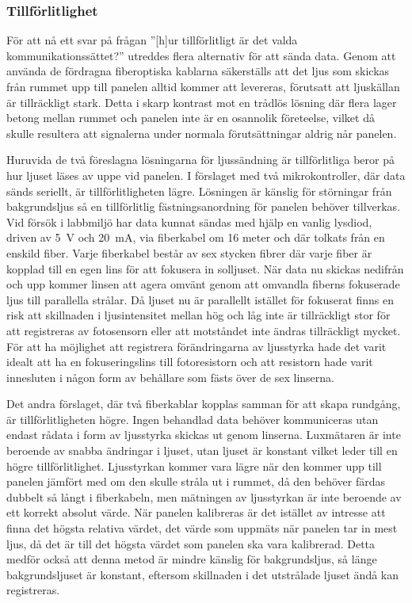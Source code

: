 
        \subsubsection{Tillförlitlighet} %
        \label{sub:tillf_rlitlighet}
            För att nå ett svar på frågan ''[h]ur tillförlitligt är det valda kommunikationssättet?'' utreddes flera alternativ för att sända data. Genom att använda de fördragna fiberoptiska kablarna säkerställs att det ljus som skickas från rummet upp till panelen alltid kommer att levereras, förutsatt att ljuskällan är tillräckligt stark. Detta i skarp kontrast mot en trådlös lösning där flera lager betong mellan rummet och panelen inte är en osannolik företeelse, vilket då skulle resultera att signalerna under normala förutsättningar aldrig når panelen. \bigskip

            Huruvida de två föreslagna lösningarna för ljussändning är tillförlitliga beror på hur ljuset läses av uppe vid panelen. I förslaget med två mikrokontroller, där data sänds seriellt, är tillförlitligheten lägre. Lösningen är känslig för störningar från bakgrundsljus så en tillförlitlig fästningsanordning för panelen behöver tillverkas. Vid försök i labbmiljö har data kunnat sändas med hjälp en vanlig lysdiod, driven av 5~V och 20~mA, via fiberkabel om 16 meter och där tolkats från en enskild fiber. Varje fiberkabel består av sex stycken fibrer där varje fiber är kopplad till en egen lins för att fokusera in solljuset. När data nu skickas nedifrån och upp kommer linsen att agera omvänt genom att omvandla fiberns fokuserade ljus till parallella strålar. Då ljuset nu är parallellt istället för fokuserat finns en risk att skillnaden i ljusintensitet mellan hög och låg inte är tillräckligt stor för att registreras av fotosensorn eller att motståndet inte ändras tillräckligt mycket. För att ha möjlighet att registrera förändringarna av ljusstyrka hade det varit idealt att ha en fokuseringslins till fotoresistorn och att resistorn hade varit innesluten i någon form av behållare som fästs över de sex linserna. \bigskip

            Det andra förslaget, där två fiberkablar kopplas samman för att skapa rundgång, är tillförlitligheten högre. Ingen behandlad data behöver kommuniceras utan endast rådata i form av ljusstyrka skickas ut genom linserna. Luxmätaren är inte beroende av snabba ändringar i ljuset, utan ljuset är konstant vilket leder till en högre tillförlitlighet. Ljusstyrkan kommer vara lägre när den kommer upp till panelen jämfört med om den skulle stråla ut i rummet, då den behöver färdas dubbelt så långt i fiberkabeln, men mätningen av ljusstyrkan är inte beroende av ett korrekt absolut värde. När panelen kalibreras är det istället av intresse att finna det högsta relativa värdet, det värde som uppmäts när panelen tar in mest ljus, då det är till det högsta värdet som panelen ska vara kalibrerad. Detta medför också att denna metod är mindre känslig för bakgrundsljus, så länge bakgrundsljuset är konstant, eftersom skillnaden i det utstrålade ljuset ändå kan registreras.\bigskip 


